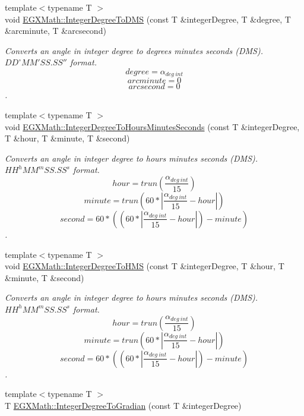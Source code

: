 \begin{DoxyCompactItemize}
{\footnotesize template$<$typename T $>$ }\\void \mbox{\hyperlink{group___e_g_x_math-_angle_conversions-_integer_degree_gaf76779bcc23268b41d4c3a7610d60eaf}{E\+G\+X\+Math\+::\+Integer\+Degree\+To\+D\+MS}} (const T \&integer\+Degree, T \&degree, T \&arcminute, T \&arcsecond)
\begin{DoxyCompactList}\small\item\em Converts an angle in integer degree to degrees minutes seconds (D\+MS). ${DD}^{\circ}{MM}'{SS.SS}''$ format. \[degree=\alpha_{deg\ int}\] \[arcminute= 0\] \[arcsecond= 0\]. \end{DoxyCompactList}\item 
{\footnotesize template$<$typename T $>$ }\\void \mbox{\hyperlink{group___e_g_x_math-_angle_conversions-_integer_degree_gaaac96728b305fd8ed024843f4e92fd08}{E\+G\+X\+Math\+::\+Integer\+Degree\+To\+Hours\+Minutes\+Seconds}} (const T \&integer\+Degree, T \&hour, T \&minute, T \&second)
\begin{DoxyCompactList}\small\item\em Converts an angle in integer degree to hours minutes seconds (D\+MS). ${HH}^{h}{MM}^{m}{SS.SS}^{s}$ format. \[hour=trun(\frac{\alpha_{deg\ int}}{15})\] \[minute=trun(60 * |\frac{\alpha_{deg\ int}}{15} - hour|)\] \[second=60 * ((60 * |\frac{\alpha_{deg\ int}}{15} - hour|)-minute)\]. \end{DoxyCompactList}\item 
{\footnotesize template$<$typename T $>$ }\\void \mbox{\hyperlink{group___e_g_x_math-_angle_conversions-_integer_degree_gae6b79bd5a92f8c6942b9fc2c50695e6a}{E\+G\+X\+Math\+::\+Integer\+Degree\+To\+H\+MS}} (const T \&integer\+Degree, T \&hour, T \&minute, T \&second)
\begin{DoxyCompactList}\small\item\em Converts an angle in integer degree to hours minutes seconds (D\+MS). ${HH}^{h}{MM}^{m}{SS.SS}^{s}$ format. \[hour=trun(\frac{\alpha_{deg\ int}}{15})\] \[minute=trun(60 * |\frac{\alpha_{deg\ int}}{15} - hour|)\] \[second=60 * ((60 * |\frac{\alpha_{deg\ int}}{15} - hour|)-minute)\]. \end{DoxyCompactList}\item 
{\footnotesize template$<$typename T $>$ }\\T \mbox{\hyperlink{group___e_g_x_math-_angle_conversions-_integer_degree_ga47127467ff7a8ef57f6be9ce496a97df}{E\+G\+X\+Math\+::\+Integer\+Degree\+To\+Gradian}} (const T \&integer\+Degree)

\end{DoxyCompactItemize}
